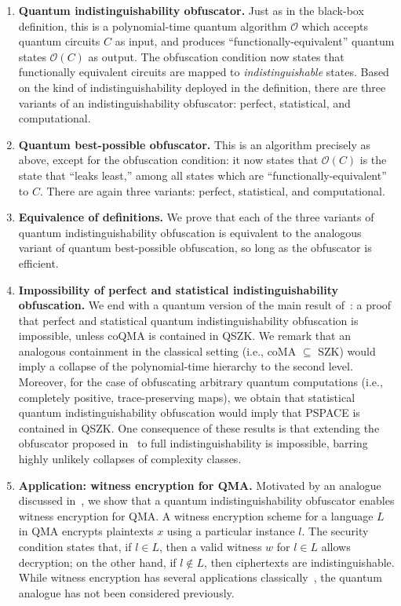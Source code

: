 \documentclass[11pt]{article}
\numberwithin{equation}{section}
\newcommand{\algo}{\mathcal}
\begin{document}
{\begin{enumerate}
\item \textbf{Quantum indistinguishability obfuscator.} Just as in the black-box definition, this is a polynomial-time quantum algorithm $\algo O$ which accepts quantum circuits $C$ as input, and produces ``functionally-equivalent'' quantum states $\algo O(C)$ as output. The obfuscation condition now states that functionally equivalent circuits are mapped to \emph{indistinguishable} states. Based on the kind of indistinguishability deployed in the definition, there are three variants of an indistinguishability obfuscator: perfect, statistical, and computational.
\item \textbf{Quantum best-possible obfuscator.} This is an algorithm precisely as above, except for the obfuscation condition: it now states that $\algo O(C)$ is the state that ``leaks least,'' among all states which are ``functionally-equivalent'' to $C$. There are again three variants: perfect, statistical, and computational.
\item \textbf{Equivalence of definitions.} We prove that each of the three variants of quantum indistinguishability obfuscation is equivalent to the analogous variant of quantum best-possible obfuscation, so long as the obfuscator is efficient.
\item \textbf{Impossibility of perfect and statistical indistinguishability obfuscation.} We end with a quantum version of the main result of~\cite{GR07}: a proof that perfect and statistical quantum indistinguishability obfuscation is impossible, unless coQMA is contained in QSZK. We remark that an analogous containment in the classical setting (i.e., coMA $\subseteq$ SZK) would imply a collapse of the polynomial-time hierarchy to the second level. Moreover, for the case of obfuscating arbitrary quantum computations (i.e., completely positive, trace-preserving maps), we obtain that statistical quantum indistinguishability obfuscation would imply that PSPACE is contained in QSZK. One consequence of these results is that extending the obfuscator proposed in~\cite{AJJ14} to full indistinguishability is impossible, barring highly unlikely collapses of complexity classes.
\item \textbf{Application: witness encryption for QMA.} Motivated by an analogue discussed in~\cite{GGSW13, GGHRSW13}, we show that a quantum indistinguishability obfuscator enables witness encryption for QMA. A witness encryption scheme for a language $L$ in QMA encrypts plaintexts $x$ using a particular instance $l$. The security condition states that, if $l \in L$, then a valid witness $w$ for $l \in L$ allows decryption; on the other hand, if $l \notin L$, then ciphertexts are indistinguishable. While witness encryption has several applications classically~\cite{GGSW13}, the quantum analogue has not been considered previously.
\end{enumerate}

}
\end{document}
